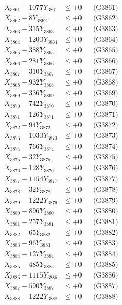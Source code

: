 \documentclass[a4paper,10pt]{article}
\begin{document}
{\begin{align}
\allowbreak
X_{3861} - 1077Y_{3861} &\leq +0 && \text{(G3861)} \\
X_{3862} - 8Y_{3862} &\leq +0 && \text{(G3862)} \\
X_{3863} - 315Y_{3863} &\leq +0 && \text{(G3863)} \\
X_{3864} - 1200Y_{3864} &\leq +0 && \text{(G3864)} \\
X_{3865} - 388Y_{3865} &\leq +0 && \text{(G3865)} \\
X_{3866} - 281Y_{3866} &\leq +0 && \text{(G3866)} \\
X_{3867} - 310Y_{3867} &\leq +0 && \text{(G3867)} \\
X_{3868} - 932Y_{3868} &\leq +0 && \text{(G3868)} \\
X_{3869} - 336Y_{3869} &\leq +0 && \text{(G3869)} \\
X_{3870} - 742Y_{3870} &\leq +0 && \text{(G3870)} \\
\allowbreak
X_{3871} - 126Y_{3871} &\leq +0 && \text{(G3871)} \\
X_{3872} - 94Y_{3872} &\leq +0 && \text{(G3872)} \\
X_{3873} - 1030Y_{3873} &\leq +0 && \text{(G3873)} \\
X_{3874} - 766Y_{3874} &\leq +0 && \text{(G3874)} \\
X_{3875} - 32Y_{3875} &\leq +0 && \text{(G3875)} \\
X_{3876} - 128Y_{3876} &\leq +0 && \text{(G3876)} \\
X_{3877} - 1154Y_{3877} &\leq +0 && \text{(G3877)} \\
X_{3878} - 32Y_{3878} &\leq +0 && \text{(G3878)} \\
X_{3879} - 1222Y_{3879} &\leq +0 && \text{(G3879)} \\
X_{3880} - 896Y_{3880} &\leq +0 && \text{(G3880)} \\
\allowbreak
X_{3881} - 257Y_{3881} &\leq +0 && \text{(G3881)} \\
X_{3882} - 65Y_{3882} &\leq +0 && \text{(G3882)} \\
X_{3883} - 96Y_{3883} &\leq +0 && \text{(G3883)} \\
X_{3884} - 127Y_{3884} &\leq +0 && \text{(G3884)} \\
X_{3885} - 485Y_{3885} &\leq +0 && \text{(G3885)} \\
X_{3886} - 1115Y_{3886} &\leq +0 && \text{(G3886)} \\
X_{3887} - 590Y_{3887} &\leq +0 && \text{(G3887)} \\
X_{3888} - 1222Y_{3888} &\leq +0 && \text{(G3888)} \\

\end{align}}
\end{document}
